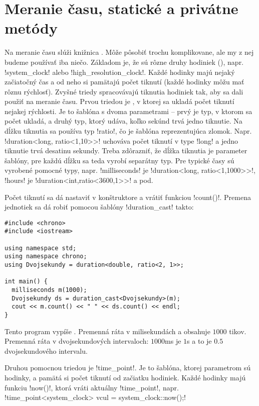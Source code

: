 \chapter{Meranie času, statické a privátne metódy}
\label{sect:clock}

Na meranie času slúži knižnica . 
Môže pôsobiť trochu komplikovane, ale my z
nej budeme používať iba niečo. Základom je, že sú rôzne druhy hodiniek (),
napr. \prg!system_clock! alebo \prg!high_resolution_clock!. Každé hodinky majú
nejaký začiatočný čas a od neho si pamätajú počet tiknutí (každé hodinky môžu mať
rôznu rýchlosť).
Zvyšné triedy spracovávajú tiknutia hodiniek tak, aby sa
dali použiť na meranie času. Prvou triedou je , v ktorej sa ukladá počet
tiknutí nejakej rýchlosti. Je to šablóna s dvoma parametrami -- prvý je typ, v ktorom
sa počet ukladá, a druhý typ, ktorý udáva, koľko sekúnd trvá jedno tiknutie.
Na dĺžku tiknutia sa používa typ \prg!ratio!, čo je šablóna reprezentujúca zlomok.
Napr. \prg!duration<long, ratio<1,10>>! 
uchováva počet tiknutí v type \prg!long!
a jedno tiknutie trvá desatinu sekundy. 
Treba zdôrazniť, že dĺžka tiknutia je parameter šablóny, 
pre každú dĺžku sa teda vyrobí separátny typ. 
Pre typické časy sú vyrobené pomocné typy, napr. \prg!milliseconds!
je \prg!duration<long, ratio<1,1000>>!, \prg!hours! je \prg!duration<int,ratio<3600,1>>!
a pod.


Počet tiknutí sa dá nastaviť v konštruktore a vrátiť funkciou \prg!count()!.
Premena jednotiek sa dá robiť pomocou šablóny \prg!duration_cast! takto:

\begin{lstlisting}
#include <chrono>
#include <iostream>

using namespace std;
using namespace chrono;
using Dvojsekundy = duration<double, ratio<2, 1>>;

int main() {
  milliseconds m(1000);
  Dvojsekundy ds = duration_cast<Dvojsekundy>(m);
  cout << m.count() << " " << ds.count() << endl;
} 

\end{lstlisting}

Tento program vypíše . Premenná   ráta v milisekundách a
obsahuje $1000$ tikov. Premenná  ráta v dvojsekundových intervaloch:
$1000$ms je $1$s a to je $0.5$ dvojsekundového intervalu.


Druhou pomocnou triedou je \prg!time_point!. Je to šablóna, ktorej parametrom sú hodinky,
a pamätá si počet tiknutí od začiatku hodiniek. Každé hodinky majú funkciu \prg!now()!,
ktorá vráti aktuálny \prg!time_point!, napr.
\prg!time_point<system_clock> vcul = system_clock::now();!

